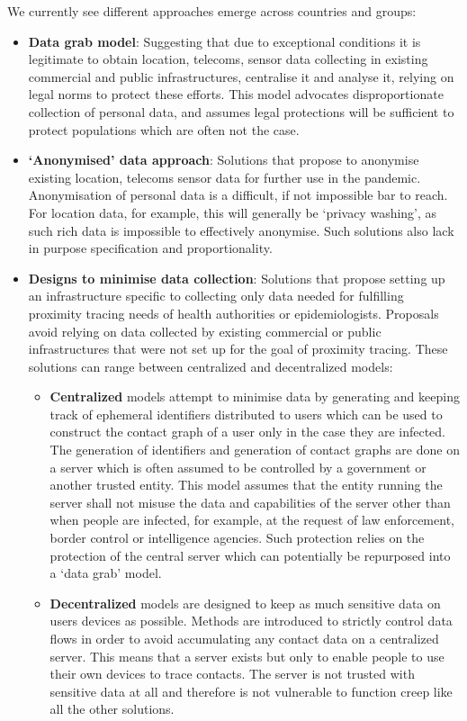 \documentclass[12pt,a4paper]{article}
\begin{document}
We currently see different approaches  emerge across countries and groups:
\begin{itemize}\itemsep0pt
\item \textbf{Data grab model}: Suggesting that due to exceptional conditions it is legitimate to obtain location, telecoms, sensor data collecting in existing commercial and public infrastructures, centralise it and analyse it, relying on legal norms to protect these efforts. This model advocates disproportionate collection of personal data, and
assumes legal protections will be sufficient to protect populations which are often not
the case.
\item \textbf{‘Anonymised’ data approach}: Solutions that propose to anonymise existing
location, telecoms sensor data for further use in the pandemic. Anonymisation of
personal data is a difficult, if not impossible bar to reach. For location data, for
example, this will generally be ‘privacy washing’, as such rich data is impossible to
effectively anonymise. Such solutions also lack in purpose specification and
proportionality.
\item \textbf{Designs to minimise data collection}: Solutions that propose setting up an
infrastructure specific to collecting only data needed for fulfilling proximity tracing
needs of health authorities or epidemiologists. Proposals avoid relying on data
collected by existing commercial or public infrastructures that were not set up for the
goal of proximity tracing. These solutions can range between centralized and
decentralized models:
\begin{itemize}\itemsep0pt
\item \textbf{Centralized} models attempt to minimise data by generating and keeping track of ephemeral identifiers distributed to users which can be used to construct the contact graph of a user only in the case they are infected. The generation of identifiers and generation of contact graphs are done on a server which is often assumed to be controlled by a government or another trusted entity. This model assumes that the entity running the server shall not misuse the data and capabilities of the server other than when people are
infected, for example, at the request of law enforcement, border control or intelligence agencies. Such protection relies on the protection of the central server which can potentially be repurposed into a ‘data grab’ model.
\item \textbf{Decentralized} models are designed to keep as much sensitive data on users devices as possible. Methods are introduced to strictly control data flows in order to avoid accumulating any contact data on a centralized server. This means that a server exists but only to enable people to use their own devices to trace contacts. The server is not trusted with sensitive data at all and therefore is not vulnerable to function creep like all the other solutions.
\end{itemize}
\end{itemize}
\end{document}
